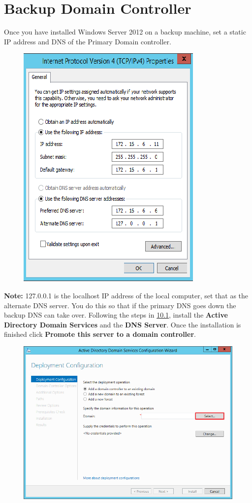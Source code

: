 \documentclass{article}
\begin{document}
\section{Backup Domain Controller}
Once you have installed Windows Server 2012 on a backup machine, set a static IP address and DNS of the Primary Domain controller. 
\begin{figure}[h]
	\centering
	\includegraphics[width=0.35\linewidth, height=.35\textheight]{BDC/1}
\end{figure}
\newline \textbf{Note:} 127.0.0.1 is the localhost IP address of the local computer, set that as the alternate DNS server. You do this so that if the primary DNS goes down the backup DNS can take over.
\newpage Following the steps in \hyperref[sec:10.1]{10.1}, install the \textbf{Active Directory Domain Services} and the \textbf{DNS Server}. Once the installation is finished click \textbf{Promote this server to a domain controller}.
\begin{figure}[h]
	\centering
	\includegraphics[width=.5\linewidth, height=.25\textheight]{BDC/1b}
\end{figure}
\end{document}
